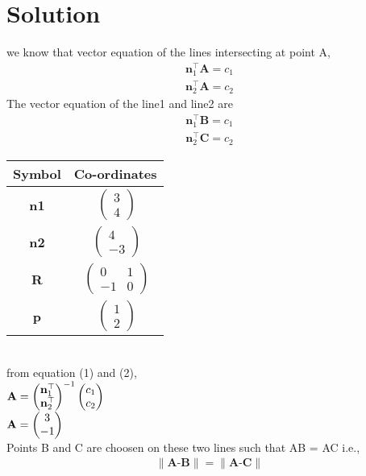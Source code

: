  \section{Solution}
we know that vector equation of the lines intersecting at point A, 
\begin{align}
 \textbf{n}_{1}^{\top}\textbf{A}=c_1 \\
  \textbf{n}_{2}^{\top}\textbf{A}=c_2
\end{align}
The vector equation of the line1 and line2 are
\begin{align}
  \textbf{n}_{1}^{\top}\textbf{B}=c_1 \\
  \textbf{n}_{2}^{\top}\textbf{C}=c_2
\end{align}
\centering
\begin{tabular}{|c |c |}
     \hline %
	\large\textbf{Symbol} & \large\textbf{Co-ordinates}  \\
       \hline
	\large \textbf{n1} & $\ \begin{pmatrix} 3\\ 4 \end{pmatrix}$  \\
        \hline
	\large \textbf{n2} & $\ \begin{pmatrix} 4\\ -3 \end{pmatrix}$  \\
        \hline
	 \large \textbf{R} & $\ \begin{pmatrix}0 & 1 \\ -1 & 0 \end{pmatrix}$ \\
       \hline
     \large \textbf{p} & $\ \begin{pmatrix} 1\\ 2 \end{pmatrix}$  \\
        \hline
    \end{tabular}
\\
from equation (1) and (2), \\
$ \textbf{A} =\begin{pmatrix}\textbf{n}_{1}^{\top} \\ \textbf{n}_{2}^{\top}\end{pmatrix}^{-1}\begin{pmatrix}{c}_{1} \\ {c}_{2}\end{pmatrix}$\\
$\textbf{A}=\begin{pmatrix}3\\ -1\end{pmatrix} $\\ 
Points B and C are choosen on these two lines such that AB = AC i.e.,
\begin{align}
\| \textbf{A-B} \| = \| \textbf{A-C} \| 
\end{align}
